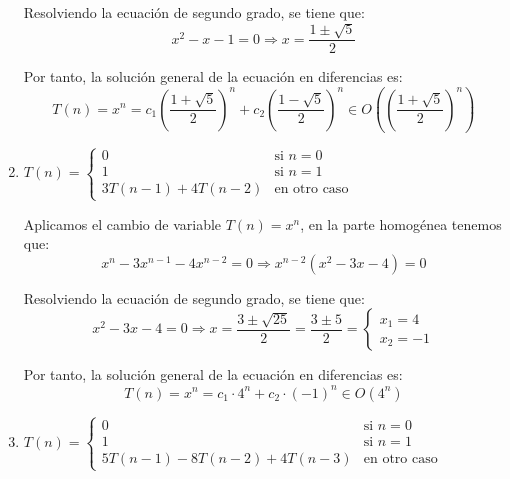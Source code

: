 \begin{ejercicio}
\begin{enumerate}[label=\alph*)]
        Resolviendo la ecuación de segundo grado, se tiene que:
        \begin{equation*}
            x^2 - x - 1 = 0 \Longrightarrow x = \frac{1\pm \sqrt{5}}{2}
        \end{equation*}

        Por tanto, la solución general de la ecuación en diferencias es:
        \begin{equation*}
            T(n) = x^n = c_1\left(\frac{1+ \sqrt{5}}{2}\right)^n + c_2\left(\frac{1- \sqrt{5}}{2}\right)^n \in O\left(\left(\frac{1+ \sqrt{5}}{2}\right)^n\right)
        \end{equation*}


        \item $T(n) = \begin{cases}
            0 & \text{si } n = 0 \\
            1 & \text{si } n = 1 \\
            3T(n-1) + 4T(n-2) & \text{en otro caso}
        \end{cases}$

        Aplicamos el cambio de variable $T(n)=x^n$, en la parte homogénea tenemos que:
        \begin{equation*}
            x^n - 3x^{n-1} - 4x^{n-2} = 0 \Longrightarrow x^{n-2}(x^2 - 3x - 4)=0
        \end{equation*}

        Resolviendo la ecuación de segundo grado, se tiene que:
        \begin{equation*}
            x^2 - 3x - 4 = 0 \Longrightarrow x = \frac{3\pm \sqrt{25}}{2} = \frac{3\pm 5}{2} = \left\{\begin{array}{l}
                x_1 = 4 \\
                x_2 = -1
            \end{array}\right.
        \end{equation*}

        Por tanto, la solución general de la ecuación en diferencias es:
        \begin{equation*}
            T(n) = x^n = c_1\cdot 4^n + c_2\cdot (-1)^n \in O(4^n)
        \end{equation*}

        \item $T(n) = \begin{cases}
            0 & \text{si } n = 0 \\
            1 & \text{si } n = 1 \\
            5T(n-1) - 8T(n-2) +4T(n-3)& \text{en otro caso}
        \end{cases}$


\end{enumerate}
\end{ejercicio}
